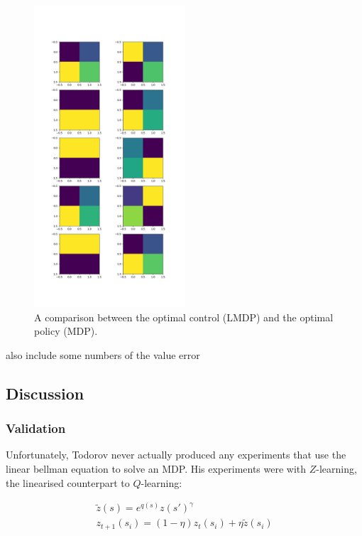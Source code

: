\begin{figure}
\centering
\includegraphics[width=0.5\textwidth,height=0.75\textheight]{../../pictures/figures/lmdp_mdp_optimal_dynamics.png}
\caption{A comparison between the optimal control (LMDP) and the optimal policy (MDP).}
\end{figure}

{\color{red}also include some numbers of the value error}

\subsection{Discussion}

\subsubsection{Validation} \label{lmdp-validation}

Unfortunately, Todorov \cite{Todorov2006,Todorov2009} never actually produced
any experiments that use the linear bellman equation to solve an MDP.
His experiments were with $Z$-learning, the linearised counterpart to $Q$-learning:

\begin{align*}
\tilde z(s) = e^{q(s)}z(s{'})^{\gamma} \tag{linearised bellman eqn}\\
z_{t+1}(s_i) = (1- \eta)z_{t}(s_i) + \eta\tilde z(s_i) \tag{$Z$ iteration}\\
\end{align*}

